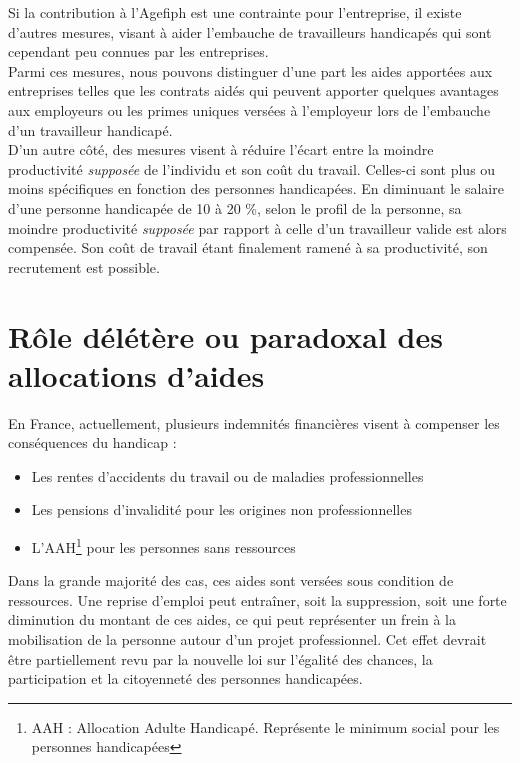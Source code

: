 Si la contribution à l'Agefiph est une contrainte pour l'entreprise, il existe d'autres mesures, visant à aider l'embauche de travailleurs handicapés qui sont cependant peu connues par les entreprises.\\

Parmi ces mesures, nous pouvons distinguer d'une part les aides apportées aux entreprises telles que les contrats aidés qui peuvent apporter quelques avantages aux employeurs ou les primes uniques versées à l'employeur lors de l'embauche d'un travailleur handicapé.\\

D'un autre c\^oté, des mesures visent à réduire l'écart entre la moindre productivité \textit{supposée} de l'individu et son co\^ut du travail. Celles-ci sont plus ou moins spécifiques en fonction des personnes handicapées. En diminuant le salaire d'une personne handicapée de 10 à 20 \%, selon le profil de la personne, sa moindre productivité \textit{supposée} par rapport à celle d'un travailleur valide est alors compensée. Son co\^ut de travail étant finalement ramené à sa productivité, son recrutement est possible.

\section{R\^ole délétère ou paradoxal des allocations d'aides}
\label{allocationsAide}

En France, actuellement, plusieurs indemnités financières visent à compenser les conséquences du handicap :
\begin{itemize}
\item Les rentes d'accidents du travail ou de maladies professionnelles
\item Les pensions d'invalidité pour les origines non professionnelles
\item L'AAH\footnote{AAH : Allocation Adulte Handicapé. Représente le minimum social pour les personnes handicapées} pour les personnes sans ressources\\
\end{itemize}

Dans la grande majorité des cas, ces aides sont versées sous condition de ressources. 
Une reprise d'emploi peut entraîner, soit la suppression, soit une forte diminution du montant de ces aides, ce qui peut représenter un frein à la mobilisation de la personne autour d'un projet professionnel. Cet effet devrait être partiellement revu par la nouvelle loi sur l'égalité des chances, la participation et la citoyenneté des personnes handicapées.

